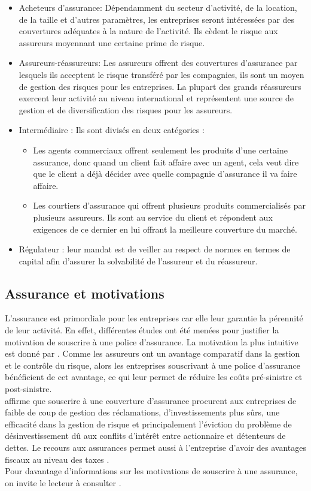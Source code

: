 \documentclass[11pt]{article}
\begin{document}
\begin{itemize}
\item Acheteurs d’assurance: Dépendamment du secteur d’activité, de la location, de la taille et d’autres paramètres, les entreprises seront intéressées par des couvertures adéquates à la nature de l’activité. Ils cèdent le risque aux assureurs moyennant une certaine prime de risque.
\item Assureurs-réassureurs: Les assureurs offrent des couvertures d’assurance par lesquels ils acceptent le risque transféré par les compagnies, ils sont un moyen de gestion des risques pour les entreprises. La plupart des grands réassureurs exercent leur activité au niveau international et représentent une source de gestion et de diversification des risques pour les assureurs.
\item Intermédiaire : Ils sont divisés en deux catégories :
\begin{itemize}
\item Les agents commerciaux offrent seulement les produits d’une certaine assurance, donc quand un client fait affaire avec un agent, cela veut dire que le client a déjà décider avec quelle compagnie d’assurance il va faire affaire.
\item  Les courtiers d’assurance qui offrent plusieurs produits commercialisés par plusieurs assureurs. Ils sont au service du client et répondent aux exigences de ce dernier en lui offrant la meilleure couverture du marché.
\end{itemize} 

\item Régulateur : leur mandat est de veiller au respect de normes en termes de capital afin d’assurer la solvabilité de l’assureur et du réassureur. 
\end{itemize}

\subsection{Assurance et motivations}
L’assurance est primordiale pour les entreprises car elle leur garantie la pérennité de leur activité.  En effet, différentes études ont été menées pour justifier la motivation de souscrire à une police d’assurance. La motivation la plus intuitive est donné par \cite{mayers1982}.  Comme les assureurs ont un avantage comparatif dans la gestion et le contrôle du risque, alors les entreprises souscrivant à une police d’assurance bénéficient de cet avantage, ce qui leur permet de réduire les coûts pré-sinistre et post-sinistre.\\
\cite{mayers1987} affirme que souscrire à une couverture d’assurance procurent aux entreprises de faible de coup de gestion des réclamations, d’investissements plus sûrs, une efficacité dans la gestion de risque et principalement l’éviction du problème de désinvestissement dû aux conflits d'intérêt entre actionnaire et détenteurs de dettes. Le recours aux assurances permet aussi à l’entreprise d’avoir des avantages fiscaux au niveau des taxes \cite{macminn1987}.\\
Pour davantage d’informations sur les motivations de souscrire à une assurance, on invite le lecteur à consulter \cite{hoyt2000}.
\end{document}
